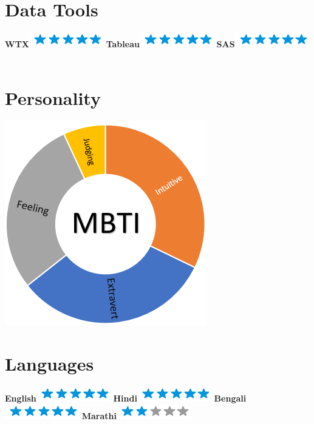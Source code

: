 \documentclass[]{friggeri-cv}
\begin{document}
\begin{aside}
  \section{Data Tools}
     \textbf{WTX}\includegraphics[scale=0.40]{img/5stars.png}
    \textbf{Tableau}\includegraphics[scale=0.40]{img/5stars.png}
    \textbf{SAS}\includegraphics[scale=0.40]{img/5stars.png}
    ~
  \section{Personality}
    \includegraphics[scale=0.50]{img/MBTI.PNG}
    ~
 \section{Languages}
    \textbf{English}\includegraphics[scale=0.40]{img/5stars.png}
    \textbf{Hindi}\includegraphics[scale=0.40]{img/5stars.png}
    \textbf{Bengali}\includegraphics[scale=0.40]{img/5stars.png}
    \textbf{Marathi}\includegraphics[scale=0.40]{img/2stars.png}
    


\end{aside}
\end{document}
